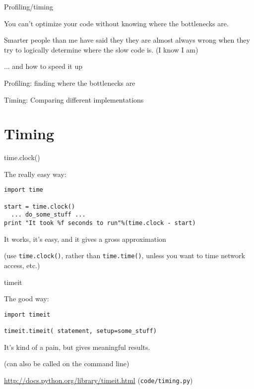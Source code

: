 \documentclass{beamer}
\begin{document}
\begin{frame}[fragile]{Profiling/timing}

\vfill
{\Large You can't optimize your code without knowing where the bottlenecks are.}

\vfill
{\Large Smarter people than me have said they they are almost always wrong
when they try to logically determine where the slow code is. (I know I am)}

\vfill
{\Large ... and how to speed it up}

\vfill
{\Large Profiling: finding where the bottlenecks are}

\vfill
{\Large Timing: Comparing different implementations}

\end{frame} 


\section{Timing}

\begin{frame}[fragile]{time.clock()}

{\Large The really easy way:}

\begin{verbatim}
import time

start = time.clock()
  ... do_some_stuff ...
print "It took %f seconds to run"%(time.clock - start)
\end{verbatim}

{\Large It works, it's easy, and it gives a gross approximation}

\vfill
(use \verb|time.clock()|, rather than \verb|time.time()|, unless you want to time network access, etc.)

\end{frame} 

\begin{frame}[fragile]{timeit}

{\Large The good way:}

\begin{verbatim}
import timeit

timeit.timeit( statement, setup=some_stuff)

\end{verbatim}

{\Large It's kind of a pain, but gives meaningful results.}

(can also be called on the command line)

\vfill
\url{http://docs.python.org/library/timeit.html}
\vfill
(\verb|code/timing.py|)
\end{frame} 
\end{document}
